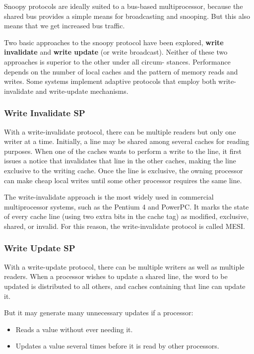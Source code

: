 Snoopy protocols are ideally suited to a bus-based multiprocessor, because the shared bus provides a simple means for broadcasting and snooping. But this also means that we get increased bus traffic.

Two basic approaches to the snoopy protocol have been explored, \textbf{write invalidate} and \textbf{write update} (or write broadcast). Neither of these two approaches is superior to the other under all circum- stances. Performance depends on the number of local caches and the pattern of memory reads and writes. Some systems implement adaptive protocols that employ both write-invalidate and write-update mechanisms.
\subsubsection{Write Invalidate SP}
With a write-invalidate protocol, there can be multiple readers but only one writer at a time. Initially, a line may be shared among several caches for reading purposes. When one of the caches wants to perform a write to the line, it first issues a notice that invalidates that line in the other caches, making the line exclusive to the writing cache. Once the line is exclusive, the owning processor can make cheap local writes until some other processor requires the same line.

The write-invalidate approach is the most widely used in commercial multiprocessor systems, such as the Pentium 4 and PowerPC. It marks the state of every cache line (using two extra bits in the cache tag) as modified, exclusive, shared, or invalid. For this reason, the write-invalidate protocol is called MESI.


\subsubsection{Write Update SP}
With a write-update protocol, there can be multiple writers as well as multiple readers. When a processor wishes to update a shared line, the word to be updated is distributed to all others, and caches containing that line can update it.

But it may generate many unnecessary updates if a processor:
\begin{itemize}
\item Reads a value without ever needing it. 
\item Updates a value several times before it is read by other processors. 
\end{itemize}

